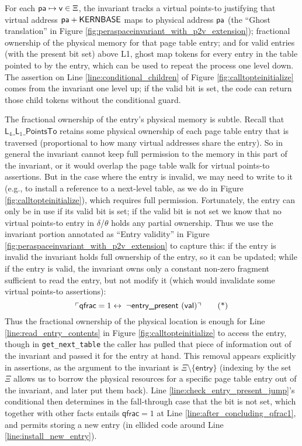 For each $\textsf{pa}\mapsto \textsf{v} \in\Xi$, the invariant tracks a virtual points-to justifying that virtual address $\textsf{pa}+\textsf{KERNBASE}$ maps to physical address $\textsf{pa}$
(the ``Ghost translation'' in Figure \ref{fig:peraspaceinvariant_with_p2v_extension});
fractional ownership of the physical memory for that page table entry;
and for valid entries (with the present bit set) above L1, ghost map tokens for every entry in the table pointed to by the entry, which can be used
to repeat the process one level down. 
The assertion on Line \ref{line:conditional_children} of Figure \ref{fig:calltopteinitialize} comes from the invariant one level up; 
if the valid bit is set,
the code can return those child tokens without the conditional guard.

The fractional ownership of the entry's physical memory is subtle. Recall that $\textsf{L}_{4}\_\textsf{L}_{1}\_\textsf{PointsTo}$ retains some physical
ownership of each page table entry that is traversed (proportional to how many virtual addresses share the entry).
So in general the invariant cannot keep full permission to the memory in this part of the invariant, or it would overlap the page table walk for virtual points-to
assertions. But in the case where the entry is invalid, we may need to write to it (e.g., to install a reference to a next-level table, as we do in Figure \ref{fig:calltopteinitialize}),
which requires full permission. Fortunately, the entry can only be in use if its valid bit is set; if the valid bit is not set we know
that no virtual points-to entry in $\delta$/$\theta$ holds any partial ownership.
Thus we use the invariant portion annotated as ``Entry validity'' in Figure \ref{fig:peraspaceinvariant_with_p2v_extension} to capture this:
if the entry is invalid the invariant holds full ownership of the entry, so it can be updated; while if the entry is valid,
the invariant owns only a constant non-zero fragment sufficient to read the entry, but not modify it (which would invalidate some virtual points-to assertions):
\begin{equation*}
 \ulcorner \textsf{qfrac} = 1 \leftrightarrow \; \lnot\textsf{entry\_present }(\textsf{val}) \urcorner \tag{*}
\end{equation*}
Thus the fractional ownership of the physical location is enough for Line \ref{line:read_entry_contents} in Figure \ref{fig:calltopteinitialize} to access the entry, though in \lstinline|get_next_table|
the caller has pulled that piece of information out of the invariant and passed it for the entry at hand.
This removal appears explicitly in assertions,
as the argument to the invariant is $\Xi\setminus\{\mathsf{entry}\}$ (indexing by the set $\Xi$ allows us to borrow the physical resources
for a specific page table entry out of the invariant, and later put them back).
Line \ref{line:check_entry_present_jump}'s conditional then determines in the fall-through case that the bit is not set, which 
together with other facts entails $\textsf{qfrac} = 1$ at Line \ref{line:after_concluding_qfrac1},
and permits storing a new entry (in ellided code around Line \ref{line:install_new_entry}).

